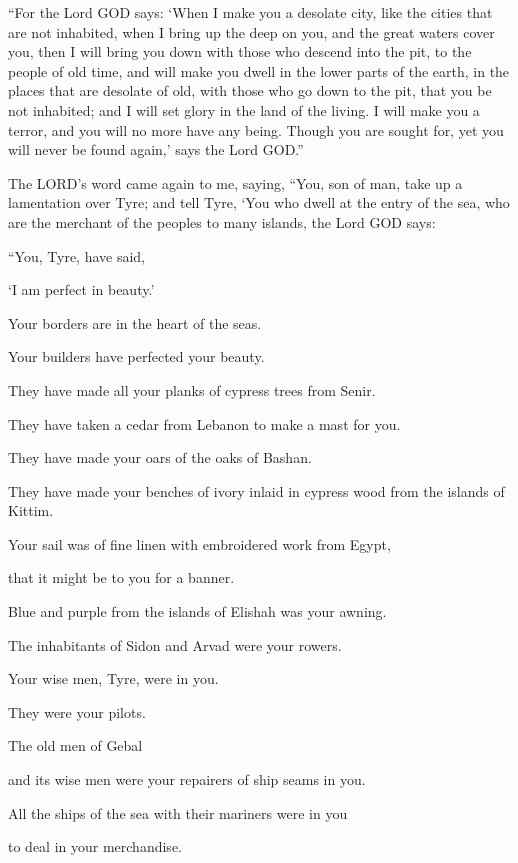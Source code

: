 \myverse{}“For the Lord GOD says: ‘When I make you a desolate city, like
the cities that are not inhabited, when I bring up the deep on you, and the great waters cover you,
\myverse{}then I will bring you down with those who descend into the pit, to the people
of old time, and will make you dwell in the lower parts of the earth, in the places that are desolate
of old, with those who go down to the pit, that you be not inhabited; and I will set glory in the land
of the living.
\myverse{}I will make you a terror, and you will no more have any being. Though you
are sought for, yet you will never be found again,’ says the Lord GOD.”


\mychapter{} \myverse*{}The LORD’s word came again to me, saying,
\myverse{}“You, son of man, take up a lamentation over Tyre;
\myverse{}and tell Tyre, ‘You who dwell at the entry of the sea, who are the merchant
of the peoples to many islands, the Lord GOD says:

“You, Tyre, have said,

‘I am perfect in beauty.’

\myverse{}Your borders are in the heart of the seas.

Your builders have perfected your beauty.

\myverse{}They have made all your planks of cypress trees from Senir.

They have taken a cedar from Lebanon to make a mast for you.

\myverse{}They have made your oars of the oaks of Bashan.

They have made your benches of ivory inlaid in cypress wood from the islands of
Kittim.

\myverse{}Your sail was of fine linen with embroidered work from Egypt,

that it might be to you for a banner.

Blue and purple from the islands of Elishah was your awning.

\myverse{}The inhabitants of Sidon and Arvad were your rowers.

Your wise men, Tyre, were in you.

They were your pilots.

\myverse{}The old men of Gebal

and its wise men were your repairers of ship seams in you.

All the ships of the sea with their mariners were in you

to deal in your merchandise.


